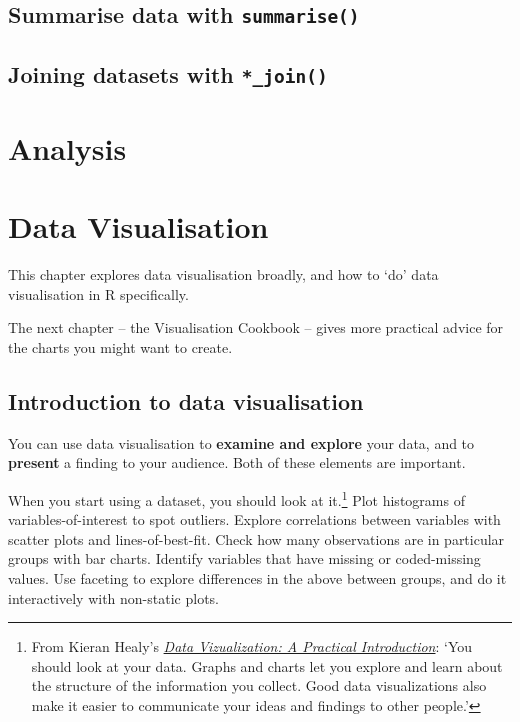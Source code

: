 \documentclass[]{book}
\let\rmarkdownfootnote\footnote%
\def\footnote{\protect\rmarkdownfootnote}
\begin{document}
\hypertarget{summarise-data-with-summarise}{%
\section{\texorpdfstring{Summarise data with \texttt{summarise()}}{Summarise data with summarise()}}\label{summarise-data-with-summarise}}

\hypertarget{joining-datasets-with-_join}{%
\section{\texorpdfstring{Joining datasets with \texttt{*\_join()}}{Joining datasets with *\_join()}}\label{joining-datasets-with-_join}}

\hypertarget{analysis}{%
\chapter{Analysis}\label{analysis}}

\hypertarget{data-visualisation}{%
\chapter{Data Visualisation}\label{data-visualisation}}

This chapter explores data visualisation broadly, and how to `do' data visualisation in R specifically.

The next chapter -- the Visualisation Cookbook -- gives more practical advice for the charts you might want to create.

\hypertarget{introduction-to-data-visualisation}{%
\section{Introduction to data visualisation}\label{introduction-to-data-visualisation}}

You can use data visualisation to \textbf{examine and explore} your data, and to \textbf{present} a finding to your audience. Both of these elements are important.

When you start using a dataset, you should look at it.\footnote{From Kieran Healy's \href{https://socviz.co/}{\emph{Data Vizualization: A Practical Introduction}}: `You should look at your data. Graphs and charts let you explore and learn about the structure of the information you collect. Good data visualizations also make it easier to communicate your ideas and findings to other people.'} Plot histograms of variables-of-interest to spot outliers. Explore correlations between variables with scatter plots and lines-of-best-fit. Check how many observations are in particular groups with bar charts. Identify variables that have missing or coded-missing values. Use faceting to explore differences in the above between groups, and do it interactively with non-static plots.
\end{document}
